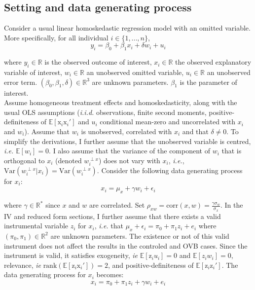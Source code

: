 \documentclass[usletter, 12pt]{article}
\begin{document}
		\subsection{Setting and data generating process}\label{maths_dgp}
		
			Consider a usual linear homoskedastic regression model with an omitted variable. More specifically, for all individual $i \in \{1, ..., n\}$, 
				~
				\begin{equation}\label{maths_dgp_y}
					y_i = \beta_{0} + \beta_{1}x_{i} + \delta w_{i} + u_i
				\end{equation}
				
				where $y_i \in \mathbb{R}$ is the observed outcome of interest, $x_i \in \mathbb{R}$ the observed explanatory variable of interest,  $w_i \in \mathbb{R}$ an unobserved omitted variable, $u_i \in \mathbb{R}$ an unobserved error term.  $(\beta_0, \beta_1, \delta) \in \mathbb{R}^{3}$ are unknown parameters. $\beta_1$ is the parameter of interest.\\
			
			Assume homogeneous treatment effects and homoskedasticity, along with the usual OLS assumptions (\textit{i.i.d.} observations, finite second moments, positive-definiteness of $\mathbb{E}[\text{x}_i \text{x}_i']$ and $u_{i}$ conditional mean-zero and uncorrelated with $x_i$ and $w_i$). Assume that $w_{i}$ is unobserved, correlated with $x_{i}$ and that $\delta \neq 0$. To simplify the derivations, I further assume that the unobserved variable is centred, \textit{i.e.} $\mathbb{E}[w_i] = 0$. I also assume that the variance of the component of $w_{i}$ that is orthogonal to $x_{i}$ (denoted $w_{i}^{\perp x}$) does not vary with $x_{i}$, \textit{i.e.}, $\text{Var}(w_{i}^{\perp x}|x_{i}) = \text{Var}(w_{i}^{\perp x})$. Consider the following data generating process for $x_i$:
				~
				\begin{equation}\label{maths_dgp_x}
					x_i = \mu_{x} + \gamma w_{i} + \epsilon_i
				\end{equation}
				
				where $\gamma \in \mathbb{R}^{*}$ since $x$ and $w$ are correlated. Set $\rho_{xw} = \text{corr}(x, w) =  \frac{\gamma \sigma_{w}}{\sigma_{x}}$. In the IV and reduced form sections, I further assume that there exists a valid instrumental variable $z_i$ for $x_i$, \textit{i.e.} that $\mu_x + \epsilon_{i} = \pi_0 + \pi_1 z_i + e_{i}$  where $(\pi_0, \pi_1) \in \mathbb{R}^{2}$ are unknown parameters. The existence or not of this valid instrument does not affect the results in the controled and \textsc{OVB} cases. Since the instrument is valid, it satisfies exogeneity, \textit{ie} $\mathbb{E}[\text{z}_{i}u_{i}] = 0$ and  $\mathbb{E}[z_{i}w_{i}] = 0$, relevance, \textit{ie} $\text{rank}(\mathbb{E}[\text{z}_{i}\text{x}_i']) = 2$,  and positive-definiteness of $\mathbb{E}[\text{z}_i \text{z}_i']$. The data generating process for $x_i$ becomes:			
				~
				\begin{equation}\label{maths_dgp_x_iv}
					x_i = \pi_0 + \pi_1 z_i + \gamma w_{i} + e_{i}
				\end{equation}
				
\end{document}
